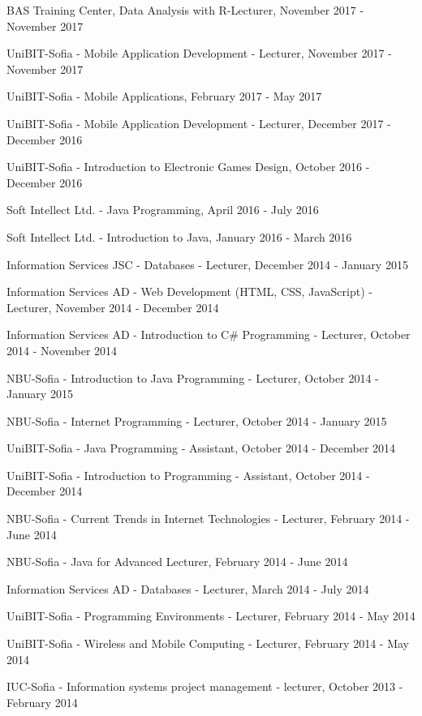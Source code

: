 \documentclass[english,a4paper]{europasscv}
\begin{document}
\begin{europasscv}
{\begin{ecvitemize}
    \item BAS Training Center, Data Analysis with R-Lecturer, November 2017 - November 2017
    \item UniBIT-Sofia - Mobile Application Development - Lecturer, November 2017 - November 2017
    \item UniBIT-Sofia - Mobile Applications, February 2017 - May 2017
    \item UniBIT-Sofia - Mobile Application Development - Lecturer, December 2017 - December 2016
    \item UniBIT-Sofia - Introduction to Electronic Games Design, October 2016 - December 2016
    \item Soft Intellect Ltd. - Java Programming, April 2016 - July 2016
    \item Soft Intellect Ltd. - Introduction to Java, January 2016 - March 2016
    \item Information Services JSC - Databases - Lecturer, December 2014 - January 2015
    \item Information Services AD - Web Development (HTML, CSS, JavaScript) - Lecturer, November 2014 - December 2014
    \item Information Services AD - Introduction to C\# Programming - Lecturer, October 2014 - November 2014
    \item NBU-Sofia - Introduction to Java Programming - Lecturer, October 2014 - January 2015
    \item NBU-Sofia - Internet Programming - Lecturer, October 2014 - January 2015
    \item UniBIT-Sofia - Java Programming - Assistant, October 2014 - December 2014
    \item UniBIT-Sofia - Introduction to Programming - Assistant, October 2014 - December 2014
    \item NBU-Sofia - Current Trends in Internet Technologies - Lecturer, February 2014 - June 2014
    \item NBU-Sofia - Java for Advanced Lecturer, February 2014 - June 2014
    \item Information Services AD - Databases - Lecturer, March 2014 - July 2014
    \item UniBIT-Sofia - Programming Environments - Lecturer, February 2014 - May 2014
    \item UniBIT-Sofia - Wireless and Mobile Computing - Lecturer, February 2014 - May 2014
    \item IUC-Sofia - Information systems project management - lecturer, October 2013 - February 2014

\end{ecvitemize}}
\end{europasscv}
\end{document}
